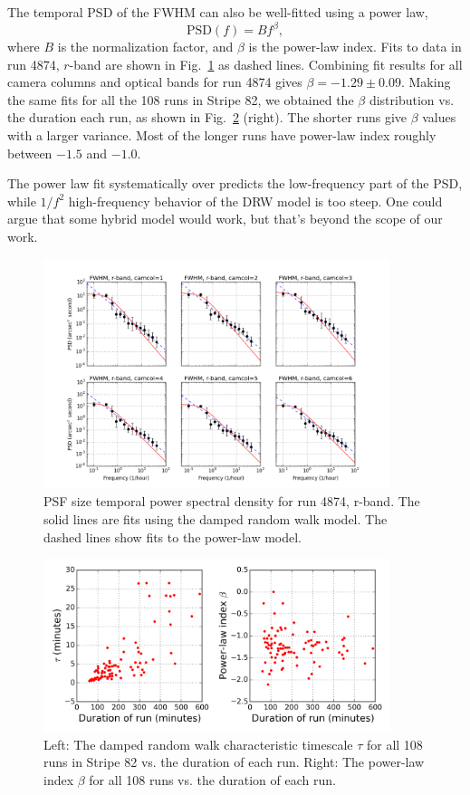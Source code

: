 The temporal PSD of the FWHM can also be well-fitted using a power
law,
\begin{equation}
\textrm{PSD}(f) = B f^\beta,
\end{equation}
where $B$ is the normalization factor, and $\beta$ is the power-law
index.
Fits to data in run 4874, $r$-band are shown in
Fig.~\ref{fig:psd} as dashed lines.
Combining fit results for all camera columns and optical bands for run 4874
gives $\beta = -1.29\pm 0.09$.
Making the same fits for all the 108 runs in Stripe 82, 
we obtained the $\beta$ distribution vs. the duration each
run, as shown in Fig.~\ref{fig:hist} (right).
The shorter runs give $\beta$ values with a larger variance.
Most of the longer runs have power-law index roughly between $-1.5$ and $-1.0$.

The power law fit systematically over predicts the low-frequency part of the PSD,
while $1/f^2$ high-frequency behavior of the DRW model is too steep. One could argue that
some hybrid model would work, but that's beyond the scope of our work. 

\begin{figure}
\centering
\includegraphics[width=0.9\textwidth]{FIGURES/temporalPSD.png}
\caption{PSF size temporal power spectral density for run 4874, r-band. 
The solid lines are fits using the damped random walk model. 
The dashed lines show fits to the power-law model.
\label{fig:psd}}
\end{figure}

\begin{figure}
\centering
\includegraphics[width=0.9\textwidth]{FIGURES/taubeta.png}
\caption{Left: The damped random walk characteristic
  timescale $\tau$ for all 108 runs in Stripe 82 vs. the duration of 
each run. Right: The power-law index $\beta$ for all 108 runs vs. the
duration of each run.
\label{fig:hist}}
\end{figure}


